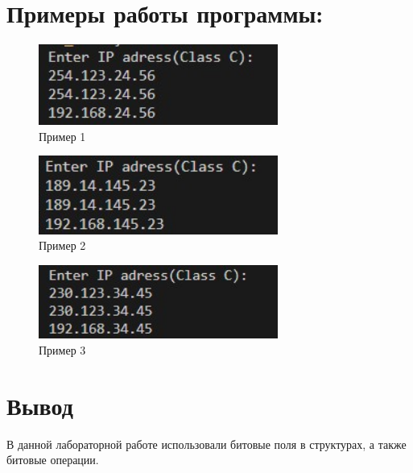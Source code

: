 \documentclass[a4paper,12pt]{report}
\begin{document}
\section*{Примеры работы программы:}
\begin{figure}[ph]
    \includegraphics[width=0.7\textwidth]{ex1.jpg}
\caption{Пример 1}
\label{ris:image1}
\end{figure}
\begin{figure}[ph]
    \includegraphics[width=0.7\textwidth]{ex2.jpg}
\caption{Пример 2}
\label{ris:image2}
\end{figure}




\begin{figure}[ph]
\includegraphics[width=0.7\textwidth]{ex3.jpg}
\caption{Пример 3}


\end{figure}


\newpage

\section*{Вывод}
В данной лабораторной работе использовали битовые поля в структурах, а также битовые операции.
\end{document}

